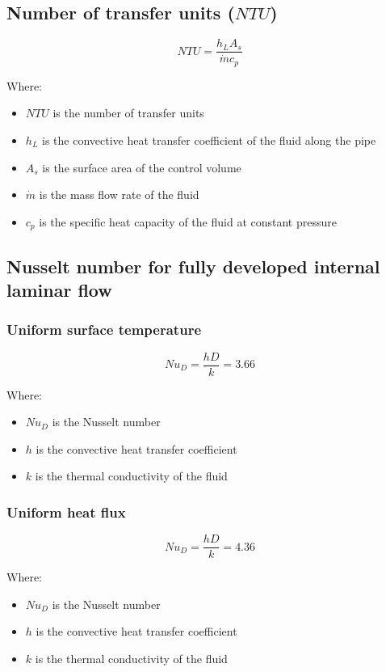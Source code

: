 \documentclass[11pt]{article}
\begin{document}
\subsection{Number of transfer units (\(NTU\))}
\label{sec:org8a14af4}
\[NTU = \frac{h_L A_s}{\dot{m} c_p}\]

Where:
\begin{itemize}
\item \(NTU\) is the number of transfer units
\item \(h_L\) is the convective heat transfer coefficient of the fluid along the pipe
\item \(A_s\) is the surface area of the control volume
\item \(\dot{m}\) is the mass flow rate of the fluid
\item \(c_p\) is the specific heat capacity of the fluid at constant pressure
\end{itemize}

\subsection{Nusselt number for fully developed internal laminar flow}
\label{sec:org95a2af0}

\subsubsection{Uniform surface temperature}
\label{sec:org11ed4c1}
\[Nu_D = \frac{hD}{k} = 3.66\]

Where:
\begin{itemize}
\item \(Nu_D\) is the Nusselt number
\item \(h\) is the convective heat transfer coefficient
\item \(k\) is the thermal conductivity of the fluid
\end{itemize}

\subsubsection{Uniform heat flux}
\label{sec:org60bb6c2}
\[Nu_D = \frac{hD}{k} = 4.36\]

Where:
\begin{itemize}
\item \(Nu_D\) is the Nusselt number
\item \(h\) is the convective heat transfer coefficient
\item \(k\) is the thermal conductivity of the fluid
\end{itemize}
\end{document}
